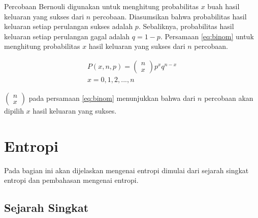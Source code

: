 Percobaan Bernouli digunakan untuk menghitung probabilitas \begin{math}x\end{math} buah hasil keluaran yang sukses dari \begin{math}n\end{math} percobaan. Diasumsikan bahwa probabilitas hasil keluaran setiap perulangan sukses adalah \begin{math}p\end{math}. Sebaliknya, probabilitas hasil keluaran setiap perulangan gagal adalah \begin{math}q=1-p\end{math}. Persamaan \ref{eq:binom} untuk menghitung probabilitas \begin{math}x\end{math} hasil keluaran yang sukses dari \begin{math}n\end{math} percobaan.

\begin{gather}
	P(x,n,p) = \left( {\begin{array}{c}n \\ x \end{array}} \right) p^x q^{n-x} \label{eq:binom} \\
	x = 0, 1, 2, ..., n \nonumber
\end{gather}

\begin{math}\left( {\begin{array}{c}n \\ x \end{array}} \right)\end{math} pada persamaan \ref{eq:binom} menunjukkan bahwa dari \begin{math}n\end{math} percobaan akan dipilih \begin{math}x\end{math} hasil keluaran yang sukses.

\section{Entropi}

Pada bagian ini akan dijelaskan mengenai entropi dimulai dari sejarah singkat entropi dan pembahasan mengenai entropi.

\subsection{Sejarah Singkat}

